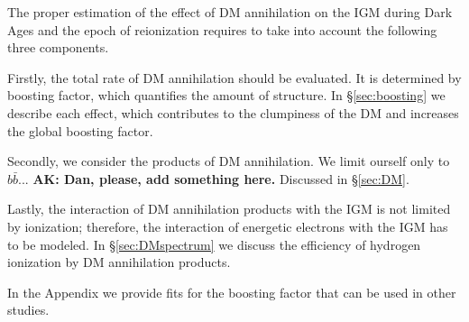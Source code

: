 The proper estimation of the effect of DM annihilation on the IGM during Dark Ages and the epoch of reionization requires to take into account the following three components.

Firstly, the total rate of DM annihilation should be evaluated. It is determined by boosting factor, which quantifies the amount of structure. In \S\ref{sec:boosting} we describe each effect, which contributes to the clumpiness of the DM and increases the global boosting factor.

Secondly, we consider the products of DM annihilation. We limit ourself only to $b\bar{b}$...
\textbf{AK: Dan, please, add something here.} Discussed in \S\ref{sec:DM}.

Lastly, the interaction of DM annihilation products with the IGM is not limited by ionization; therefore, the interaction of energetic electrons with the IGM has to be modeled. In \S\ref{sec:DMspectrum} we discuss the efficiency of hydrogen ionization by DM annihilation products.

In the Appendix we provide fits for the boosting factor that can be used in other studies.